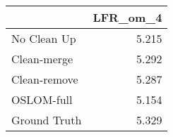 \begin{tabular}{lr}
\toprule
{} & LFR_om_4 \\
\midrule
No Clean Up  &    5.215 \\
Clean-merge  &    5.292 \\
Clean-remove &    5.287 \\
OSLOM-full   &    5.154 \\
Ground Truth &    5.329 \\
\bottomrule
\end{tabular}
